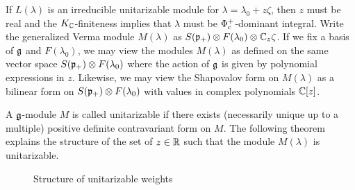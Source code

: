 If $L(\lambda)$ is an irreducible unitarizable module for $\lambda=\lambda_0+z\zeta$, then $z$ must be real and the $K_{\mathbb{C}}$-finiteness implies that $\lambda$ must be $\Phi^+_c$-dominant integral. Write the generalized Verma module $M(\lambda)$ as $S(\mathfrak{p}_+)\otimes F(\lambda_0) \otimes \mathbb{C}_z\zeta$. If we fix a basis of $\mathfrak{g}$ and $F(\lambda_0)$, we may view the modules $M(\lambda)$ as defined on the same vector space $S(\mathfrak{p}_+)\otimes F(\lambda_0)$ where the action of $\mathfrak{g}$ is given by polynomial expressions in $z$. Likewise, we may view the Shapovalov form on $M(\lambda)$ as a bilinear form on $S(\mathfrak{p}_+) \otimes F(\lambda_0)$ with values in complex polynomials $\mathbb{C}[z]$.

A $\mathfrak{g}$-module $M$ is called unitarizable if there exists (necessarily unique up to a multiple) positive definite contravariant form on $M$. The following theorem explains the structure of the set of $z\in\mathbb{R}$ such that the module $M(\lambda)$ is unitarizable.

\begin{figure}[H]
  \begin{center}
  \end{center}\caption{Structure of unitarizable weights}\label{fig:struct} %
\end{figure}

